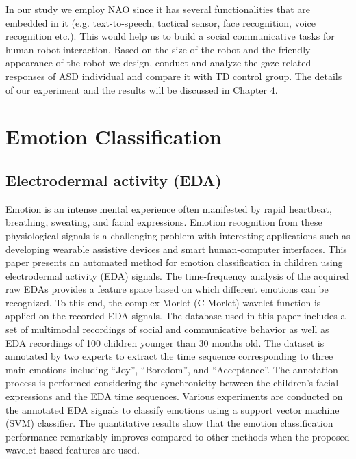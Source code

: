 In our study we employ NAO since it has several functionalities that are embedded in it (e.g. text-to-speech, tactical sensor, face recognition, voice recognition etc.). This would help us to build a social communicative tasks for human-robot interaction. Based on the size of the robot and the friendly appearance of the robot we design, conduct and analyze the gaze related responses of ASD individual and compare it with TD control group. The details of our experiment and the results will be discussed in Chapter 4.


\section{Emotion Classification}

\subsection{Electrodermal activity (EDA)}
Emotion is an intense mental experience often manifested by rapid heartbeat, breathing, 
sweating, and facial expressions. Emotion recognition from these physiological signals 
is a challenging problem with interesting applications such as developing wearable 
assistive devices and smart human-computer interfaces. This paper presents an automated 
method for emotion classification in children using electrodermal activity (EDA) signals. 
The time-frequency analysis of the acquired raw EDAs provides a feature space based on 
which different emotions can be recognized. To this end, the complex Morlet (C-Morlet) 
wavelet function is applied on the recorded EDA signals. The database used in this paper 
includes a set of multimodal recordings of social and communicative behavior as well 
as EDA recordings of 100 children younger than 30 months old. The dataset is annotated 
by two experts to extract the time sequence corresponding to three main emotions 
including “Joy”, “Boredom”, and “Acceptance”. The annotation process is performed 
considering the synchronicity between the children's facial expressions and the EDA 
time sequences. Various experiments are conducted on the annotated EDA signals to 
classify emotions using a support vector machine (SVM) classifier. The quantitative 
results show that the emotion classification performance remarkably improves compared 
to other methods when the proposed wavelet-based features are used.\\


